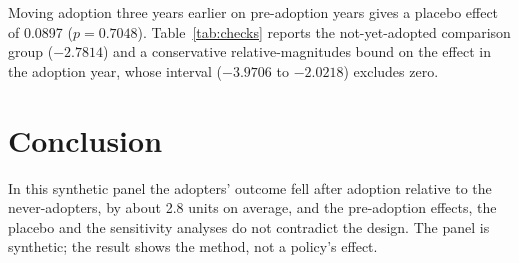 \documentclass[11pt]{article}
\begin{document}
Moving adoption three years earlier on pre-adoption years gives a placebo effect of 0.0897 ($p = 0.7048$). Table~\ref{tab:checks} reports the not-yet-adopted comparison group ($-2.7814$) and a conservative relative-magnitudes bound on the effect in the adoption year, whose interval ($-3.9706$ to $-2.0218$) excludes zero.



\section{Conclusion}

In this synthetic panel the adopters' outcome fell after adoption relative to the never-adopters, by about 2.8 units on average, and the pre-adoption effects, the placebo and the sensitivity analyses do not contradict the design. The panel is synthetic; the result shows the method, not a policy's effect.
\end{document}
